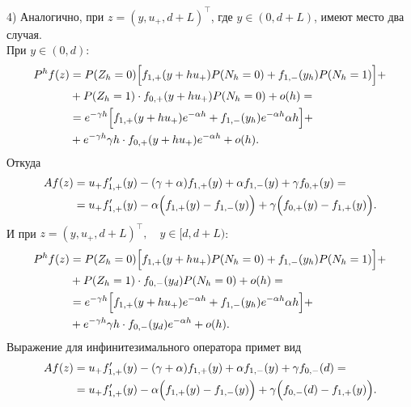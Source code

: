 \documentclass[12pt,a4paper]{article}
\begin{document}
4) Аналогично, при $z = \left(y, u_+, d + L\right)^\intercal$, где $y \in (0, d + L)$, имеют место два случая.\\
При $y \in (0, d)$:
\begin{equation*}
    \begin{aligned} 
  P^h f (z) &= P (Z_h = 0) \Bigl[f_{1, +} (y + h u_+) P (N_h = 0) + f_{1, -} (y_h) P(N_h = 1) \Bigr]  + \\
  & + P (Z_h = 1) \cdot f_{0, +} (y + h u_+) P (N_h = 0) + o (h) =\\
  & = e^{- \gamma h} \Bigl[f_{1,+} (y + h u_+) e^{- \alpha h} + f_{1, -} (y_h) e^{- \alpha h} \alpha h \Bigr] +\\
  & + e^{- \gamma h} \gamma h \cdot f_{0,+} (y + h u_+) e^{- \alpha h} + o(h).
\end{aligned}
\end{equation*}
Откуда
\begin{equation*}
    \begin{aligned}
   A f(z) &= u_+ f_{1,+}' (y) - (\gamma + \alpha) f_{1,+}(y) + \alpha f_{1,-} (y) + \gamma f_{0,+} (y) = \\
   &= u_+ f_{1,+}' (y) - \alpha \Bigl(f_{1,+}(y) - f_{1,-}(y) \Bigr) + \gamma \Bigl(f_{0,+} (y) - f_{1,+} (y) \Bigr).
    \end{aligned}
\end{equation*}
И при $z = \left(y, u_+, d + L\right)^\intercal, \quad y \in [d, d+ L)$:
\begin{equation*}
    \begin{aligned} 
  P^h f (z) &= P (Z_h = 0) \Bigl[f_{1, +} (y + h u_+) P (N_h = 0) + f_{1, -} (y_h) P(N_h = 1) \Bigr]  + \\
  & + P (Z_h = 1) \cdot f_{0, -} (y_d) P (N_h = 0) + o (h) =\\
  & = e^{- \gamma h} \Bigl[f_{1,+} (y + h u_+) e^{- \alpha h} + f_{1, -} (y_h) e^{- \alpha h} \alpha h \Bigr] +\\
  & + e^{- \gamma h} \gamma h \cdot f_{0,-} (y_d) e^{- \alpha h} + o(h).
\end{aligned}
\end{equation*}
Выражение для инфинитезимального оператора примет вид
\begin{equation*}
    \begin{aligned}
   A f(z) &= u_+ f_{1,+}' (y) - (\gamma + \alpha) f_{1,+}(y) + \alpha f_{1,-} (y) + \gamma f_{0,-} (d) = \\
   &= u_+ f_{1,+}' (y) - \alpha \Bigl(f_{1,+}(y) - f_{1,-}(y) \Bigr) + \gamma \Bigl(f_{0,-} (d) - f_{1,+} (y) \Bigr).
    \end{aligned}
\end{equation*}
\end{document}
